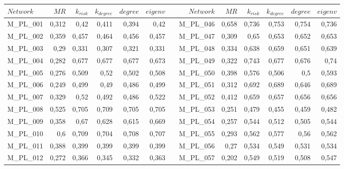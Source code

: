 \begin{table}[htbp]
\end{table}%

\begin{table}[hp]
\fontsize{2.6mm}{2.6mm}\selectfont
  \centering
    \begin{adjustbox}{angle=90}
    \begin{tabular}{lrrrrrrrrrrrr}
    \toprule
    $Network$ & $MR$ & $k_{risk}$ & $k_{degree}$ & $degree$ & $eigenv$ &    & $Network$ & $MR$ & $k_{risk}$ & $k_{degree}$ & $degree$ & $eigenv$ \\
    \midrule
       M\_PL\_001 & 0,312 & 0,42 & 0,411 & 0,394 & 0,42 &      & M\_PL\_046 & 0,658 & 0,736 & 0,753 & 0,754 & 0,736 \\
    M\_PL\_002 & 0,359 & 0,457 & 0,464 & 0,456 & 0,457 &      & M\_PL\_047 & 0,309 & 0,65 & 0,653 & 0,652 & 0,653 \\
    M\_PL\_003 & 0,29 & 0,331 & 0,307 & 0,321 & 0,331 &      & M\_PL\_048 & 0,334 & 0,638 & 0,659 & 0,651 & 0,639 \\
    M\_PL\_004 & 0,282 & 0,677 & 0,677 & 0,677 & 0,673 &      & M\_PL\_049 & 0,322 & 0,743 & 0,677 & 0,676 & 0,74 \\
    M\_PL\_005 & 0,276 & 0,509 & 0,52 & 0,502 & 0,508 &      & M\_PL\_050 & 0,398 & 0,576 & 0,506 & 0,5  & 0,593 \\
    M\_PL\_006 & 0,249 & 0,499 & 0,49 & 0,486 & 0,499 &      & M\_PL\_051 & 0,312 & 0,692 & 0,689 & 0,646 & 0,689 \\
    M\_PL\_007 & 0,329 & 0,52 & 0,492 & 0,486 & 0,522 &      & M\_PL\_052 & 0,412 & 0,659 & 0,657 & 0,656 & 0,656 \\
    M\_PL\_008 & 0,525 & 0,705 & 0,709 & 0,705 & 0,705 &      & M\_PL\_053 & 0,251 & 0,479 & 0,455 & 0,459 & 0,482 \\
    M\_PL\_009 & 0,358 & 0,67 & 0,628 & 0,615 & 0,669 &      & M\_PL\_054 & 0,257 & 0,544 & 0,512 & 0,505 & 0,544 \\
    M\_PL\_010 & 0,6  & 0,709 & 0,704 & 0,708 & 0,707 &      & M\_PL\_055 & 0,293 & 0,562 & 0,577 & 0,56 & 0,562 \\
    M\_PL\_011 & 0,388 & 0,399 & 0,399 & 0,399 & 0,399 &      & M\_PL\_056 & 0,27 & 0,534 & 0,549 & 0,531 & 0,534 \\
    M\_PL\_012 & 0,272 & 0,366 & 0,345 & 0,332 & 0,363 &      & M\_PL\_057 & 0,202 & 0,549 & 0,519 & 0,508 & 0,547 \\

\end{tabular}
\end{adjustbox}
\end{table}
